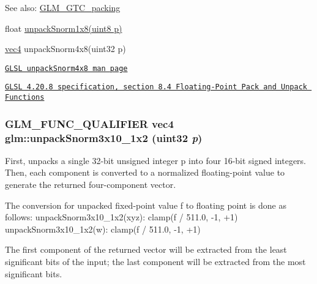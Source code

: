 \begin{Desc}
\item[See also:]\hyperlink{group__gtc__packing}{GLM\_\-GTC\_\-packing} 

float \hyperlink{group__gtc__packing_g6f2bebf536fbf7c8b97d4b306bb3354e}{unpackSnorm1x8(uint8 p)} 

\hyperlink{group__core__types_g5881b1b022d7fd1b7218f5916532dd02}{vec4} unpackSnorm4x8(uint32 p) 

\href{http://www.opengl.org/sdk/docs/manglsl/xhtml/unpackSnorm4x8.xml}{\tt GLSL unpackSnorm4x8 man page} 

\href{http://www.opengl.org/registry/doc/GLSLangSpec.4.20.8.pdf}{\tt GLSL 4.20.8 specification, section 8.4 Floating-Point Pack and Unpack Functions} \end{Desc}
\hypertarget{group__gtc__packing_g8b8bb827a3743ca553d8702d3e337101}{
\subsubsection[unpackSnorm3x10\_\-1x2]{\setlength{\rightskip}{0pt plus 5cm}GLM\_\-FUNC\_\-QUALIFIER vec4 glm::unpackSnorm3x10\_\-1x2 (uint32 {\em p})}}
\label{group__gtc__packing_g8b8bb827a3743ca553d8702d3e337101}


First, unpacks a single 32-bit unsigned integer p into four 16-bit signed integers. Then, each component is converted to a normalized floating-point value to generate the returned four-component vector.

The conversion for unpacked fixed-point value f to floating point is done as follows: unpackSnorm3x10\_\-1x2(xyz): clamp(f / 511.0, -1, +1) unpackSnorm3x10\_\-1x2(w): clamp(f / 511.0, -1, +1)

The first component of the returned vector will be extracted from the least significant bits of the input; the last component will be extracted from the most significant bits.

